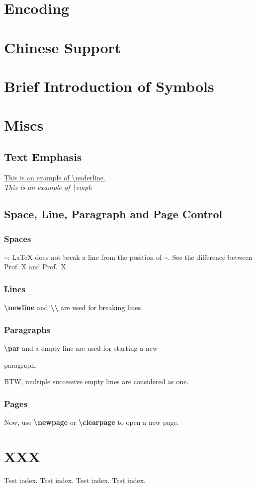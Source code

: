 \section{Encoding}
\section{Chinese Support}
\section{Brief Introduction of Symbols}
\section{Miscs}
\subsection{Text Emphasis}
\underline{This is an example of \textbackslash underline.} \\
\emph{This is an example of \textbackslash emph}
\subsection{Space, Line, Paragraph and Page Control}
\subsubsection{Spaces}
\~{}: \LaTeX{} does not break a line from the position of \~{}. 
See the difference between Prof. X and Prof.~X.

\subsubsection{Lines}
\textbf{\textbackslash newline} and \textbf{\textbackslash \textbackslash} are used
for breaking \newline lines.

\subsubsection{Paragraphs}
\textbf{\textbackslash par} and a empty line are used for starting a new 
\par 
paragraph. 


BTW, multiple successive empty lines are considered as one.

\subsubsection{Pages}
Now, use \textbf{\textbackslash newpage} or \textbf{\textbackslash clearpage} to 
open a new page.

\section{XXX}
\lipsum

Test index.
\newpage
Test index.
\newpage
Test index.
\newpage
Test index.


\newpage
